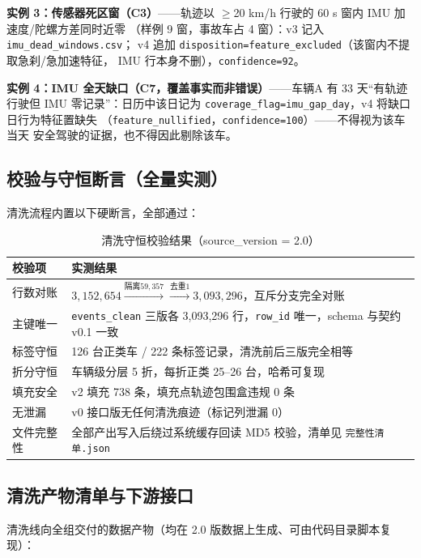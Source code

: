 \noindent\textbf{实例 3：传感器死区窗（C3）}——轨迹以 $\ge$20 km/h 行驶的 60 s 窗内 IMU 加速度/陀螺方差同时近零
（样例 9 窗，事故车占 4 窗）：v3 记入 \texttt{imu\_dead\_windows.csv}；
v4 追加 \texttt{disposition=\allowbreak feature\_excluded}（该窗内不提取急刹/急加速特征，
IMU 行本身不删），\texttt{confidence=92}。

\noindent\textbf{实例 4：IMU 全天缺口（C7，覆盖事实而非错误）}——车辆A 有 33 天“有轨迹行驶但 IMU 零记录”：日历中该日记为
\texttt{coverage\_flag=\allowbreak imu\_gap\_day}，v4 将缺口日行为特征置缺失
（\texttt{feature\_nullified}，\texttt{confidence=100}）——不得视为该车当天
安全驾驶的证据，也不得因此剔除该车。

\subsection{校验与守恒断言（全量实测）}

清洗流程内置以下硬断言，全部通过：

\begin{table}[H]
\centering
\caption{清洗守恒校验结果（source\_version = 2.0）}
\label{tab:conservation}
\small
\begin{tabularx}{\textwidth}{LL}
\toprule
校验项 & 实测结果 \\
\midrule
行数对账 & $3{,}152{,}654 \xrightarrow{\text{隔离}59{,}357} \xrightarrow{\text{去重}1} 3{,}093{,}296$，互斥分支完全对账 \\
主键唯一 & \texttt{events\_clean} 三版各 3{,}093{,}296 行，\texttt{row\_id} 唯一，schema 与契约 v0.1 一致 \\
标签守恒 & 126 台正类车 / 222 条标签记录，清洗前后三版完全相等 \\
折分守恒 & 车辆级分层 5 折，每折正类 25--26 台，哈希可复现 \\
填充安全 & v2 填充 738 条，填充点轨迹包围盒违规 0 条 \\
无泄漏 & v0 接口版无任何清洗痕迹（标记列泄漏 0） \\
文件完整性 & 全部产出写入后绕过系统缓存回读 MD5 校验，清单见 \texttt{完整性清单.json} \\
\bottomrule
\end{tabularx}
\end{table}

\subsection{清洗产物清单与下游接口}

清洗线向全组交付的数据产物（均在 2.0 版数据上生成、可由代码目录脚本复现）：

